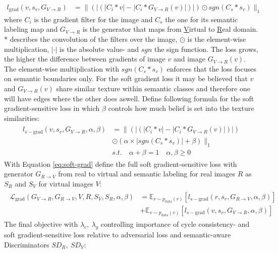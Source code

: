 \begin{align}
		l_{\text{grad}}(v,s_v,G_{V\rightarrow R}) &= \lVert(|(|C_i * v |-|C_i*G_{V\rightarrow R}(v)|)|) \odot sgn(C_s*s_v)\rVert_1
\end{align}
where $C_i$ is the gradient filter for the image and $C_s$ the one for its semantic labeling map and $G_{V\rightarrow R}$ is the generator that maps from \underline{V}irtual to \underline{R}eal domain. $*$ describes the convolution of the filters over the image, $\odot$ is the element-wise multiplication, $|\cdot|$ is the absolute value- and $sgn$ the sign function. The loss grows, the higher the difference between gradients of image $v$ and image $G_{V\rightarrow R}(v)$. The element-wise multiplication with $sgn(C_s * s_v)$ enforces that the loss focuses on semantic boundaries only. For the soft gradient loss it may be believed that $v$ and $G_{V\rightarrow R}(v)$ share similar texture within semantic classes and therefore one will have edges where the other does aswell. Define following formula for the soft gradient-sensitive loss in which $\beta$ controls how much belief is set into the texture similarities:
\begin{align}
	\begin{split}
		l_{s-\text{grad}}(v, s_v, G_{V\rightarrow R}, \alpha, \beta) &= \lVert(|(|C_i*v|-|C_i*G_{V\rightarrow R}(v)|)|)\\
		&\odot (\alpha \times |sgn(C_s*s_v)|+\beta)\rVert_1\\
		&s.t. \quad \alpha + \beta = 1 \quad \alpha, \beta \geq 0
	\end{split} \label{eq:soft-grad}
\end{align}
With Equation \ref{eq:soft-grad} define the full soft gradient-sensitive loss with generator $G_{R\rightarrow V}$ from real to virtual and semantic labeling for real images $R$ as $S_R$ and $S_V$ for virtual images $V$:
\begin{align}
	\begin{split}
		\mathcal{L}_{\text{grad}}(G_{V\rightarrow R}, G_{R\rightarrow V}, V, R, S_V, S_R, \alpha, \beta) &= \mathbb{E}_{r\sim p_{\text{data}}(r)}[l_{s-\text{grad}}(r,s_r, G_{R\rightarrow V}, \alpha, \beta)]\\
		&+ \mathbb{E}_{v\sim p_{\text{data}}(v)}[l_{s-\text{grad}}(v,s_v, G_{V\rightarrow R}, \alpha, \beta)]
	\end{split}
\end{align}
The final objective with $\lambda_c, ~ \lambda_g$ controlling importance of cycle consistency- and soft gradient-sensitive loss relative to adversarial loss and semantic-aware Discriminators $SD_R,~SD_V$:
